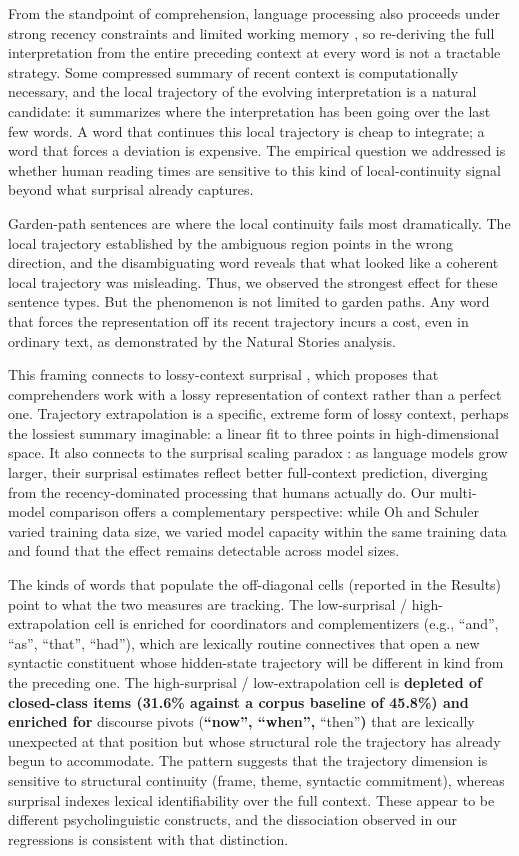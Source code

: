 \documentclass[12pt]{article}
\newcommand{\new}[1]{{\bfseries #1}}
\begin{document}
From the standpoint of comprehension, language processing also proceeds under strong recency constraints and limited working memory \citep{gibson1998,lewis2005}, so re-deriving the full interpretation from the entire preceding context at every word is not a tractable strategy. Some compressed summary of recent context is computationally necessary, and the local trajectory of the evolving interpretation is a natural candidate: it summarizes where the interpretation has been going over the last few words. A word that continues this local trajectory is cheap to integrate; a word that forces a deviation is expensive. The empirical question we addressed is whether human reading times are sensitive to this kind of local-continuity signal beyond what surprisal already captures.

Garden-path sentences are where the local continuity fails most dramatically. The local trajectory established by the ambiguous region points in the wrong direction, and the disambiguating word reveals that what looked like a coherent local trajectory was misleading. Thus, we observed the strongest effect for these sentence types. But the phenomenon is not limited to garden paths. Any word that forces the representation off its recent trajectory incurs a cost, even in ordinary text, as demonstrated by the Natural Stories analysis.

This framing connects to lossy-context surprisal \citep{futrell2020}, which proposes that comprehenders work with a lossy representation of context rather than a perfect one. Trajectory extrapolation is a specific, extreme form of lossy context, perhaps the lossiest summary imaginable: a linear fit to three points in high-dimensional space. It also connects to the surprisal scaling paradox \citep{oh2023b}: as language models grow larger, their surprisal estimates reflect better full-context prediction, diverging from the recency-dominated processing that humans actually do. Our multi-model comparison offers a complementary perspective: while Oh and Schuler varied training data size, we varied model capacity within the same training data and found that the effect remains detectable across model sizes.

The kinds of words that populate the off-diagonal cells (reported in the Results) point to what the two measures are tracking. The low-surprisal / high-extrapolation cell is enriched for coordinators and complementizers (e.g., ``and'', ``as'', ``that'', ``had''), which are lexically routine connectives that open a new syntactic constituent whose hidden-state trajectory will be different in kind from the preceding one. The high-surprisal / low-extrapolation cell is \new{depleted of closed-class items (31.6\% against a corpus baseline of 45.8\%) and enriched for} discourse pivots (\new{``now'', ``when'',} ``then''\new{)} that are lexically unexpected at that position but whose structural role the trajectory has already begun to accommodate. The pattern suggests that the trajectory dimension is sensitive to structural continuity (frame, theme, syntactic commitment), whereas surprisal indexes lexical identifiability over the full context. These appear to be different psycholinguistic constructs, and the dissociation observed in our regressions is consistent with that distinction.
\end{document}
